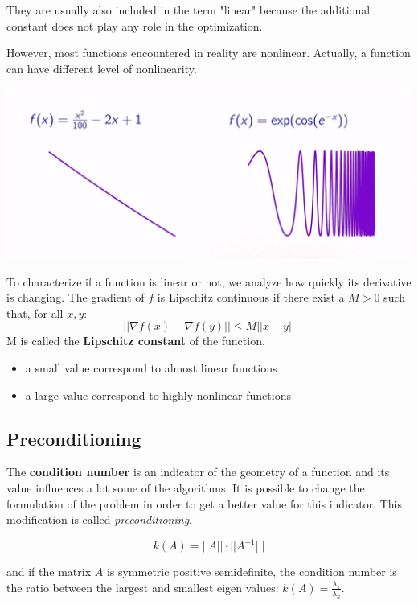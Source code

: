 They are usually also included in the term "linear" because the additional constant does not play any role in the optimization.


However, most functions encountered in reality are nonlinear. Actually, a function can have different level of nonlinearity.

\includegraphics[width=\linewidth]{content/nonlinearity.png}

To characterize if a function is linear or not, we analyze how quickly its derivative is changing. 
The gradient of $f$ is Lipschitz continuous if there exist a $M > 0$ such that, for all $x, y$:
\begin{equation}
    ||\nabla f(x)-\nabla f(y)|| \leq M||x-y||
\end{equation}
M is called the \textbf{Lipschitz constant} of the function.
\begin{itemize}
    \item a small value correspond to almost linear functions
    \item a large value correspond to highly nonlinear functions
\end{itemize}

\subsection{Preconditioning}

The \textbf{condition number} is an indicator of the geometry of a function and its value influences a lot some of the algorithms.
It is possible to change the formulation of the problem in order to get a better value for this indicator. This modification is called \textit{preconditioning}.

\begin{equation}
    k(A) = ||A||\cdot||A^{-1}]||
\end{equation}

and if the matrix $A$ is symmetric positive semidefinite, the condition number is the ratio between the largest and smallest eigen values: $k(A) = \frac{\lambda_1}{\lambda_n}$.


